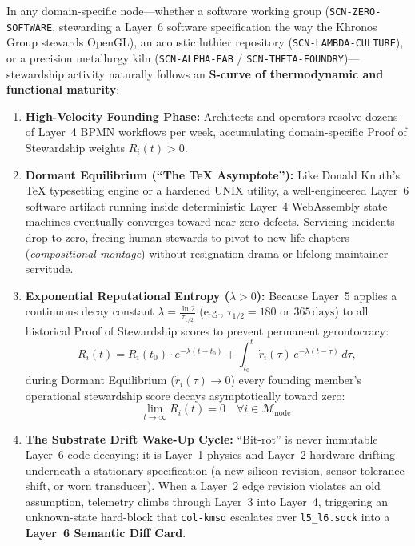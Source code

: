 In any domain-specific node---whether a software working group (\texttt{SCN-ZERO-SOFTWARE},
stewarding a Layer~6 software specification the way the Khronos Group stewards OpenGL), an
acoustic luthier repository (\texttt{SCN-LAMBDA-CULTURE}), or a precision metallurgy kiln
(\texttt{SCN-ALPHA-FAB} / \texttt{SCN-THETA-FOUNDRY})---stewardship activity naturally follows an
\textbf{S-curve of thermodynamic and functional maturity}:
\begin{enumerate}
\item \textbf{High-Velocity Founding Phase:} Architects and operators resolve dozens of Layer~4
        BPMN workflows per week, accumulating domain-specific Proof of Stewardship weights
        $R_i(t) > 0$.
\item \textbf{Dormant Equilibrium (``The \TeX{} Asymptote''):} Like Donald Knuth's \TeX{}
        typesetting engine or a hardened UNIX utility, a well-engineered Layer~6 software artifact
        running inside deterministic Layer~4 WebAssembly state machines eventually converges
        toward near-zero defects. Servicing incidents drop to zero, freeing human stewards to
        pivot to new life chapters (\textit{compositional montage}) without resignation drama or
        lifelong maintainer servitude.
\item \textbf{Exponential Reputational Entropy ($\lambda > 0$):} Because Layer~5 applies a
        continuous decay constant $\lambda = \frac{\ln 2}{\tau_{1/2}}$ (e.g., $\tau_{1/2} = 180$
        or $365\,\mathrm{days}$) to all historical Proof of Stewardship scores to prevent
        permanent gerontocracy:
        \begin{equation}
            R_i(t) = R_i(t_0)\cdot e^{-\lambda(t - t_0)} + \int_{t_0}^{t} \dot{r}_i(\tau)\,e^{-\lambda(t - \tau)}\,d\tau,
        \end{equation}
        during Dormant Equilibrium ($\dot{r}_i(\tau) \to 0$) every founding member's operational
        stewardship score decays asymptotically toward zero:
        \[
            \lim_{t \to \infty} R_i(t) = 0 \quad \forall i \in \mathcal{M}_{\mathrm{node}}.
        \]
\item \textbf{The Substrate Drift Wake-Up Cycle:} ``Bit-rot'' is never immutable Layer~6 code
        decaying; it is Layer~1 physics and Layer~2 hardware drifting underneath a stationary
        specification (a new silicon revision, sensor tolerance shift, or worn transducer). When a
        Layer~2 edge revision violates an old assumption, telemetry climbs through Layer~3 into
        Layer~4, triggering an unknown-state hard-block that \texttt{col-kmsd} escalates over
        \texttt{l5\_l6.sock} into a \textbf{Layer~6 Semantic Diff Card}.
\end{enumerate}

